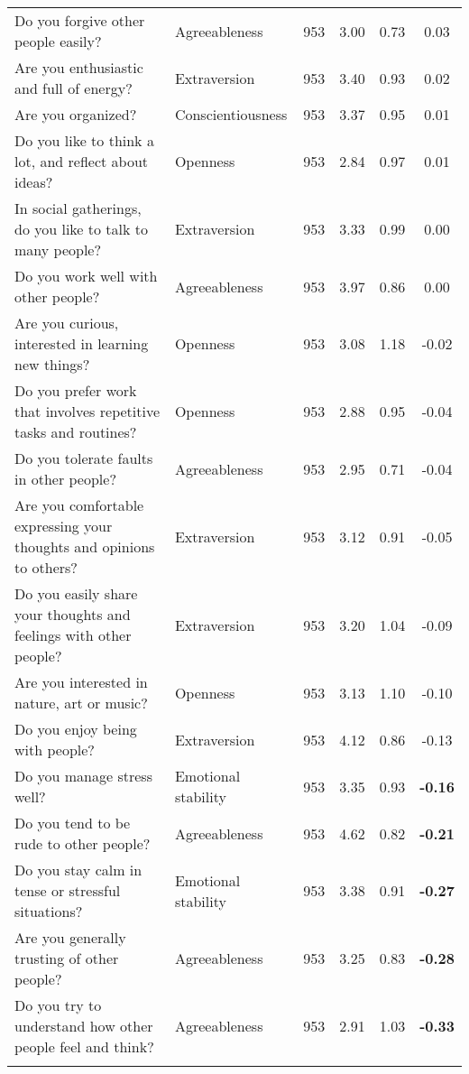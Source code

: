 \begin{table}[htbp]
{\begin{tabular}{llcccc}
    Do you forgive other people easily? & Agreeableness & 953   & 3.00  & 0.73  & 0.03 \\
    Are you enthusiastic and full of energy? & Extraversion & 953   & 3.40  & 0.93  & 0.02 \\
    Are you organized? & Conscientiousness & 953   & 3.37  & 0.95  & 0.01 \\
    Do you like to think a lot, and reflect about ideas? & Openness & 953   & 2.84  & 0.97  & 0.01 \\
    In social gatherings, do you like to talk to many people? & Extraversion & 953   & 3.33  & 0.99  & 0.00 \\
    Do you work well with other people? & Agreeableness & 953   & 3.97  & 0.86  & 0.00 \\
    Are you curious, interested in learning new things? & Openness & 953   & 3.08  & 1.18  & -0.02 \\
    Do you prefer work that involves repetitive tasks and routines? & Openness & 953   & 2.88  & 0.95  & -0.04 \\
    Do you tolerate faults in other people? & Agreeableness & 953   & 2.95  & 0.71  & -0.04 \\
    Are you comfortable expressing your thoughts and opinions to others? & Extraversion & 953   & 3.12  & 0.91  & -0.05 \\
    Do you easily share your thoughts and feelings with other people? & Extraversion & 953   & 3.20  & 1.04  & -0.09 \\
    Are you interested in nature, art or music? & Openness & 953   & 3.13  & 1.10  & -0.10 \\
    Do you enjoy being with people? & Extraversion & 953   & 4.12  & 0.86  & -0.13 \\
    Do you manage stress well? & Emotional stability & 953   & 3.35  & 0.93  & \textbf{-0.16} \\
    Do you tend to be rude to other people? & Agreeableness & 953   & 4.62  & 0.82  & \textbf{-0.21} \\
    Do you stay calm in tense or stressful situations? & Emotional stability & 953   & 3.38  & 0.91  & \textbf{-0.27} \\
    Are you generally trusting of other people? & Agreeableness & 953   & 3.25  & 0.83  & \textbf{-0.28} \\
    Do you try to understand how other people feel and think? & Agreeableness & 953   & 2.91  & 1.03  & \textbf{-0.33} \\
    \bottomrule
	\Tablenote{6}{Most contributive variables (represented with \textbf{bold font}) are used to interpret factor.} \\
    \end{tabular}%
	}
  \label{tab:factor4}%
\end{table}%
